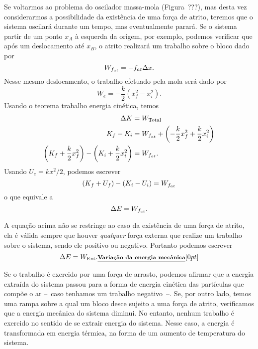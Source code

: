 Se voltarmos ao problema do oscilador massa-mola (Figura~???), mas desta vez considerarmos a possibilidade da existência de uma força de atrito, teremos que o sistema oscilará durante um tempo, mas eventualmente parará. Se o sistema partir de um ponto $x_A$ à esquerda da origem, por exemplo, podemos verificar que após um deslocamento até $x_B$, o atrito realizará um trabalho sobre o bloco dado por
\begin{equation}
  W_{f_{at}} = - f_{at} \Delta x.
\end{equation}
%
Nesse mesmo deslocamento, o trabalho efetuado pela mola será dado por
\begin{equation}
  W_e = -\frac{k}{2}(x_f^2 - x_i^2).
\end{equation}
%
Usando o teorema trabalho energia cinética, temos
\begin{align}
  \Delta K &= W_{\textrm{Total}} \\
  K_f - K_i &= W_{f_{at}} + \left(-\frac{k}{2}x_f^2 + \frac{k}{2}x_i^2\right) \\
  \left(K_f + \frac{k}{2} x_f^2\right) - \left(K_i + \frac{k}{2}x_i^2\right) &= W_{f_{at}}.
\end{align}
%
Usando $U_e = kx^2/2$, podemos escrever
\begin{equation}
  (K_f + U_f) - (K_i - U_i) = W_{f_{at}}
\end{equation}
%
o que equivale a
\begin{equation}
  \Delta E = W_{f_{at}}.
\end{equation}

A equação acima não se restringe ao caso da existência de uma força de atrito, ela é válida sempre que houver \emph{qualquer} força externa que realize um trabalho sobre o sistema, sendo ele positivo ou negativo. Portanto podemos escrever
\begin{equation}
  \Delta E = W_{\textrm{Ext}}. \relax{\footnotesize\emph{\textbf{Variação da energia mecânica}}}[0pt]
\end{equation}

Se o trabalho é exercido por uma força de arrasto, podemos afirmar que a energia extraída do sistema passou para a forma de energia cinética das partículas que compõe o ar --~caso tenhamos um trabalho negativo~--. Se, por outro lado, temos uma rampa sobre a qual um bloco desce sujeito a uma força de atrito, verificamos que a energia mecânica do sistema diminui. No entanto, nenhum trabalho é exercido no sentido de se extrair energia do sistema. Nesse caso, a energia é transformada em energia térmica, na forma de um aumento de temperatura do sistema.

